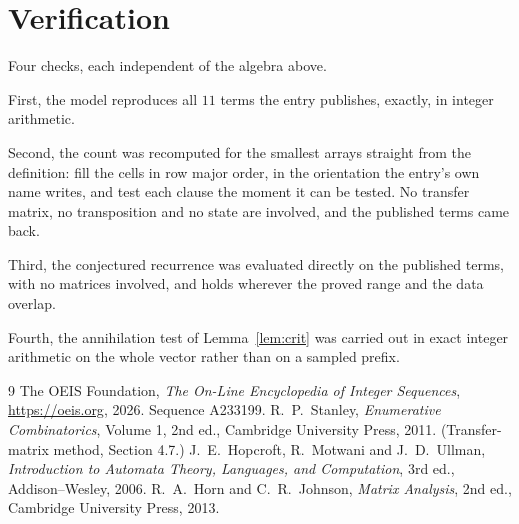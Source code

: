 \documentclass[11pt,a4paper]{article}
\theoremstyle{plain}
\theoremstyle{definition}
\begin{document}
\section{Verification}

Four checks, each independent of the algebra above.

First, the model reproduces all $11$ terms the entry publishes, exactly, in integer
arithmetic.

Second, the count was recomputed for the smallest arrays straight from the definition: fill the
cells in row major order, in the orientation the entry's own name writes, and test each clause
the moment it can be tested. No transfer matrix, no transposition and no state are involved,
and the published terms came back.

Third, the conjectured recurrence was evaluated directly on the published terms, with no
matrices involved, and holds wherever the proved range and the data overlap.

Fourth, the annihilation test of Lemma~\ref{lem:crit} was carried out in exact integer
arithmetic on the whole vector rather than on a sampled prefix.

\begin{thebibliography}{9}
 The OEIS Foundation, \emph{The On-Line Encyclopedia of Integer
Sequences}, \url{https://oeis.org}, 2026. Sequence A233199.
 R.~P.~Stanley, \emph{Enumerative Combinatorics}, Volume 1, 2nd ed.,
Cambridge University Press, 2011. (Transfer-matrix method, Section 4.7.)
 J.~E.~Hopcroft, R.~Motwani and J.~D.~Ullman, \emph{Introduction to Automata
Theory, Languages, and Computation}, 3rd ed., Addison--Wesley, 2006.
 R.~A.~Horn and C.~R.~Johnson, \emph{Matrix Analysis}, 2nd ed., Cambridge
University Press, 2013.
\end{thebibliography}
\end{document}
